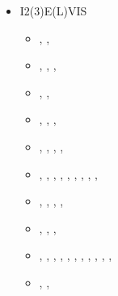 \begin{itemize}
\item {\codefont I2(3)E(L)VIS}  

\begin{scriptsize}
\begin{itemize}
\item[\twothousandthree]     \textcite{geyu03}, \textcite{geyu03b}, 
                             \textcite{geur03}
\item[\twothousandfour]      \textcite{geym04}, \textcite{geys04}, 
                             \textcite{gepm04}, \textcite{geur04}
\item[\twothousandfive]      \textcite{buge05}, \textcite{mage05},
                             \textcite{stge05}
\item[\twothousandsix]       \textcite{bube06},  \textcite{gest06},
                             \textcite{gogc06},  \textcite{gecy06}
\item[\twothousandseven]     \textcite{geyu07},  \textcite{gogc07},
                             \textcite{gebu07},  \textcite{gogg07},
                             \textcite{gowg07}
\item[\twothousandeight]     \textcite{scbe08},  \textcite{gecy08},
                             \textcite{uegs08},  \textcite{fagc08},
                             \textcite{zhgy09},  \textcite{buge08},
                             \textcite{cage08},  \textcite{migb08},
                             \textcite{nigc08},  \textcite{gepb08}
\item[\twothousandnine]      \textcite{gefc09},  \textcite{bubg09},
                             \textcite{ligt09},  \textcite{famg09},
                             \textcite{lige09}
\item[\twothousandten]       \textcite{nigm10},  \textcite{bagc10},
                             \textcite{ligb10},  \textcite{sigb10}
\item[\twothousandeleven]    \textcite{dugm11},  \textcite{dumg11},
                             \textcite{lixg11},  \textcite{gery11},
                             \textcite{geme11},  \textcite{blgg11},
                             \textcite{nigm11},  \textcite{gokg11},
                             \textcite{ligt11},  \textcite{pege11},
                             \textcite{zhgh11},  \textcite{gery11b}
\item[\twothousandtwelve]    \textcite{crsg12},  \textcite{dugk12},

\end{itemize}
\end{scriptsize}
\end{itemize}
